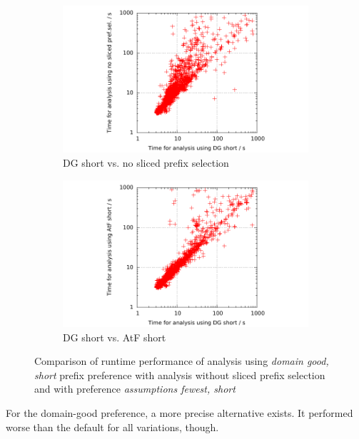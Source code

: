 \begin{figure}
\begin{subfigure}{.48\linewidth}
\includegraphics[trim=2cm 0 1cm 0, clip=true, scale=0.9]{evaluation/sp_cputime_DGS_noSelection}
\caption{DG short vs. no sliced prefix selection}
\end{subfigure}%
\hfill
\begin{subfigure}{.48\linewidth}
\includegraphics[trim=2cm 0 1cm 0, clip=true, scale=0.9]{evaluation/sp_cputime_DGS_AtFS}
\caption{DG short vs. AtF short}
\end{subfigure}
\caption{Comparison of runtime performance of analysis using \emph{domain good, short} prefix preference with analysis without sliced prefix selection and with preference \emph{assumptions fewest, short}}
\label{fig:leqComp:stopAmount}
\end{figure}

For the domain-good preference, a more precise alternative exists. It performed worse than the default for all variations, though.


